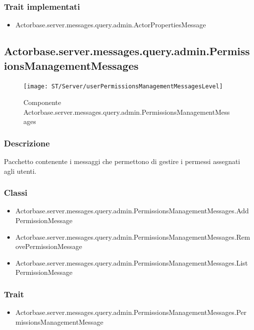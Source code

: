 \documentclass[a4paper]{article}
\begin{document}
			\subsubsection{Trait implementati}
				\begin{itemize}
					\item Actorbase.server.messages.query.admin.ActorPropertiesMessage
				\end{itemize}
				
		\subsection{Actorbase.server.messages.query.admin.PermissionsManagementMessages}
		
			\begin{figure}[H]
				\centering
				\texttt{[image: ST/Server/userPermissionsManagementMessagesLevel]}
				\caption{Componente Actorbase.server.messages.query.admin.PermissionsManagementMessages}
			\end{figure}
			
			\subsubsection{Descrizione}
				Pacchetto contenente i messaggi che permettono di gestire i permessi assegnati agli utenti.
			\subsubsection{Classi}
				\begin{itemize}
					\item Actorbase.server.messages.query.admin.PermissionsManagementMessages.AddPermissionMessage
					\item Actorbase.server.messages.query.admin.PermissionsManagementMessages.RemovePermissionMessage
					\item Actorbase.server.messages.query.admin.PermissionsManagementMessages.ListPermissionMessage
				\end{itemize}
				
			\subsubsection{Trait}
				\begin{itemize}
					\item Actorbase.server.messages.query.admin.PermissionsManagementMessages.PermissionsManagementMessage
				\end{itemize}
		
\end{document}
